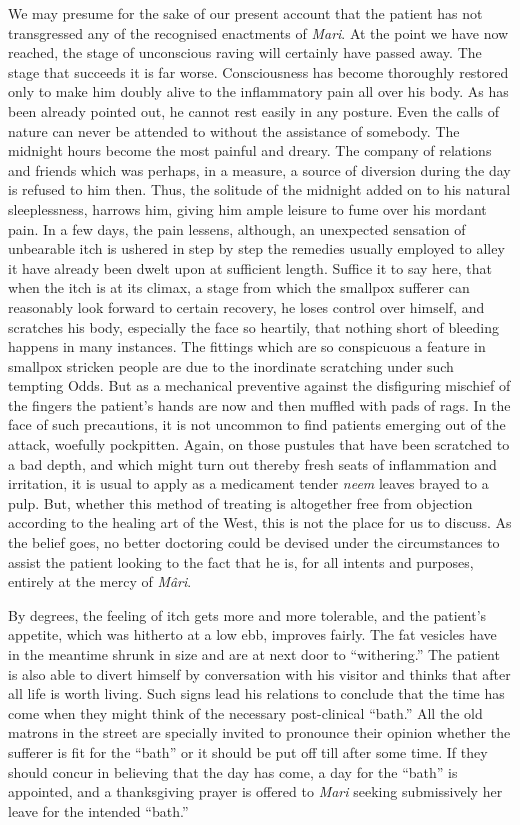\documentclass[a4paper, 12pt, oneside, english]{article}
\begin{document}
We may presume for the sake of our present account that the patient has not transgressed any of the recognised enactments of \emph{Mari}. At the point we have now reached, the stage of unconscious raving will certainly have passed away. The stage that succeeds it is far worse. Consciousness has become thoroughly restored only to make him doubly alive to the inflammatory pain all over his body. As has been already pointed out, he cannot rest easily in any posture. Even the calls of nature can never be attended to without the assistance of somebody. The midnight hours become the most painful and dreary. The company of relations and friends which was perhaps, in a measure, a source of diversion during the day is refused to him then. Thus, the solitude of the midnight added on to his natural sleeplessness, harrows him, giving him ample leisure to fume over his mordant pain. In a few days, the pain lessens, although, an unexpected sensation of unbearable itch is ushered in step by step the remedies usually employed to alley it have already been dwelt upon at sufficient length. Suffice it to say here, that when the itch is at its climax, a stage from which the smallpox sufferer can reasonably look forward to certain recovery, he loses control over himself, and scratches his body, especially the face so heartily, that nothing short of bleeding happens in many instances. The fittings which are so conspicuous a feature in smallpox stricken people are due to the inordinate scratching under such tempting Odds. But as a mechanical preventive against the disfiguring mischief of the fingers the patient's hands are now and then muffled with pads of rags. In the face of such precautions, it is not uncommon to find patients emerging out of the attack, woefully pockpitten. Again, on those pustules that have been scratched to a bad depth, and which might turn out thereby fresh seats of inflammation and irritation, it is usual to apply as a medicament tender \emph{neem} leaves brayed to a pulp. But, whether this method of treating is altogether free from objection according to the healing art of the West, this is not the place for us to discuss. As the belief goes, no better doctoring could be devised under the circumstances to assist the patient looking to the fact that he is, for all intents and purposes, entirely at the mercy of \emph{Mâri}.

By degrees, the feeling of itch gets more and more tolerable, and the patient's appetite, which was hitherto at a low ebb, improves fairly. The fat vesicles have in the meantime shrunk in size and are at next door to ``withering.'' The patient is also able to divert himself by conversation with his visitor and thinks that after all life is worth living. Such signs lead his relations to conclude that the time has come when they might think of the necessary post-clinical ``bath.'' All the old matrons in the street are specially invited to pronounce their opinion whether the sufferer is fit for the ``bath'' or it should be put off till after some time. If they should concur in believing that the day has come, a day for the ``bath'' is appointed, and a thanksgiving prayer is offered to \emph{Mari} seeking submissively her leave for the intended ``bath.''
\end{document}
